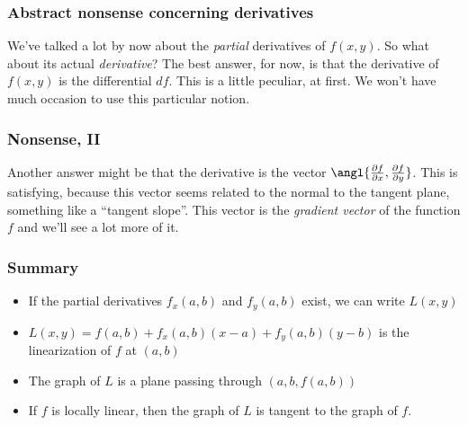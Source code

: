 \documentclass[11pt,ignorenonframetext,]{beamer}
\begin{document}
\begin{frame}\frametitle{Abstract nonsense concerning derivatives}

We've talked a lot by now about the \emph{partial} derivatives of
$f(x,y)$. So what about its actual \emph{derivative}? The best answer,
for now, is that the derivative of $f(x,y)$ is the differential $df$.
This is a little peculiar, at first. We won't have much occasion to use
this particular notion.

\end{frame}

\begin{frame}\frametitle{Nonsense, II}

Another answer might be that the derivative is the vector
$\angl{\frac{\partial f}{\partial x},\frac{\partial f}{\partial y}}$.
This is satisfying, because this vector seems related to the normal to
the tangent plane, something like a ``tangent slope''. This vector is
the \emph{gradient vector} of the function $f$ and we'll see a lot more
of it.

\end{frame}

\begin{frame}\frametitle{Summary}

\begin{itemize}[<+->]
\itemsep1pt\parskip0pt
\item
  If the partial derivatives $f_x(a,b)$ and $f_y(a,b)$ exist, we can
  write $L(x,y)$
\item
  $L(x,y) = f(a,b) + f_x(a,b)(x-a) + f_y(a,b)(y-b)$ is the linearization
  of $f$ at $(a,b)$
\item
  The graph of $L$ is a plane passing through $(a,b,f(a,b))$
\item
  If $f$ is locally linear, then the graph of $L$ is tangent to the
  graph of $f$.
\end{itemize}

\end{frame}
\end{document}
